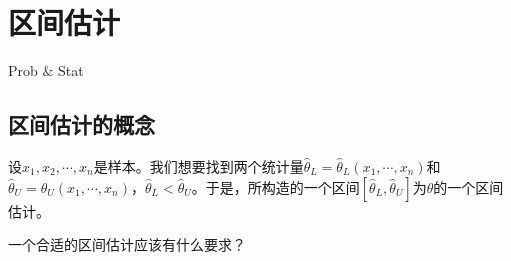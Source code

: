 \chapter{区间估计}
\begin{introduction}
  \item Prob $\&$ Stat
\end{introduction}
\section{区间估计的概念}
设$x_{1},x_{2},\cdots,x_{n}$是样本。我们想要找到两个统计量$\hat{\theta}_{L}=\hat{\theta}_{L}(x_{1},\cdots,x_{n})$和$\hat{\theta}_{U}=\hat{\theta}_{U}(x_{1},\cdots,x_{n})$，$\hat{\theta}_{L}<\hat{\theta}_{U}$。于是，所构造的一个区间$[\hat{\theta}_{L},\hat{\theta}_{U}]$为$\theta$的一个区间估计。

\begin{problem}
    一个合适的区间估计应该有什么要求？
\end{problem}
\begin{note}
    \vspace{3cm}
\end{note}

